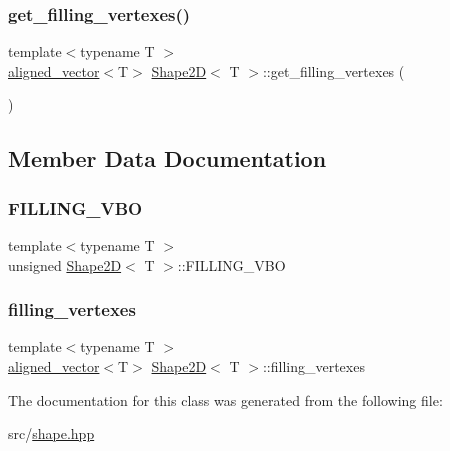 \subsubsection{\texorpdfstring{get\+\_\+filling\+\_\+vertexes()}{get\_filling\_vertexes()}}
{\footnotesize\ttfamily template$<$typename T $>$ \\
\mbox{\hyperlink{type__definitions_8hpp_accb98a876f193a416d9c8a02fe22d526}{aligned\+\_\+vector}}$<$T$>$ \mbox{\hyperlink{classShape2D}{Shape2D}}$<$ T $>$\+::get\+\_\+filling\+\_\+vertexes (\begin{DoxyParamCaption}{ }\end{DoxyParamCaption})\hspace{0.3cm}{\ttfamily [inline]}}



\subsection{Member Data Documentation}
\mbox{\label{classShape2D_a220cf4cf96da8bd43627ffffd00a0718}} 
\subsubsection{\texorpdfstring{F\+I\+L\+L\+I\+N\+G\+\_\+\+V\+BO}{FILLING\_VBO}}
{\footnotesize\ttfamily template$<$typename T $>$ \\
unsigned \mbox{\hyperlink{classShape2D}{Shape2D}}$<$ T $>$\+::F\+I\+L\+L\+I\+N\+G\+\_\+\+V\+BO\hspace{0.3cm}{\ttfamily [protected]}}

\mbox{\label{classShape2D_ae3e216c9d8422b47f46bff9259bd17be}} 
\subsubsection{\texorpdfstring{filling\+\_\+vertexes}{filling\_vertexes}}
{\footnotesize\ttfamily template$<$typename T $>$ \\
\mbox{\hyperlink{type__definitions_8hpp_accb98a876f193a416d9c8a02fe22d526}{aligned\+\_\+vector}}$<$T$>$ \mbox{\hyperlink{classShape2D}{Shape2D}}$<$ T $>$\+::filling\+\_\+vertexes\hspace{0.3cm}{\ttfamily [protected]}}



The documentation for this class was generated from the following file\+:\begin{DoxyCompactItemize}
\item 
src/\mbox{\hyperlink{shape_8hpp}{shape.\+hpp}}\end{DoxyCompactItemize}
